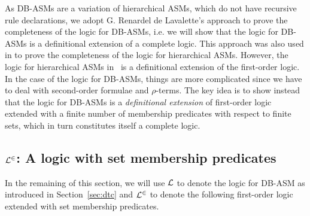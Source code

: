 \documentclass[preprint,11pt]{elsarticle}
\theoremstyle{definition}
\theoremstyle{remark}
\begin{document}
\iffalse

As DB-ASMs are a variation of hierarchical ASMs, which do not have
recursive rule declarations, we adopt G. Renardel de Lavalette's
approach to prove the completeness of the logic for DB-ASMs, i.e. we will show that the logic for DB-ASMs is a definitional extension of a complete logic. This
approach was also used in \cite{RobertLogicASM} to prove the
completeness of the logic for hierarchical ASMs. However, the logic for hierarchical ASMs in~\cite{RobertLogicASM} is a definitional extension of the first-order logic. In the case of the logic for DB-ASMs, things are more complicated since we have to deal with second-order formulae and $\rho$-terms. The key idea is to show instead that the logic for DB-ASMs is a
\emph{definitional extension} of first-order logic extended with a finite number of membership predicates with respect to finite sets, which in turn constitutes itself a complete logic.

\subsection{${\cal L}^\in$: A logic with set membership predicates}

In the remaining of this section, we will use ${\cal L}$ to denote the logic for DB-ASM as introduced in Section~\ref{sec:dtc} and ${\cal L}^\in$ to denote the following first-order logic extended with set membership predicates.
\end{document}
